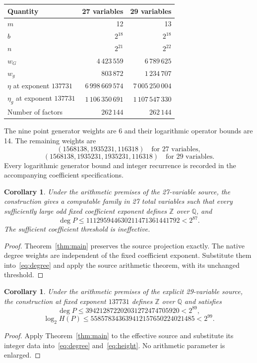 \documentclass[11pt,a4paper]{article}
\newtheorem{corollary}[theorem]{Corollary}
\newcommand{\Q}{\mathbb Q}\newcommand{\Z}{\mathbb Z}
\begin{document}
\begin{center}
\begin{tabular}{lrr}
\toprule
Quantity & 27 variables & 29 variables\\
\midrule
$m$ & 12 & 13\\
$b$ & $2^{18}$ & $2^{18}$\\
$n$ & $2^{21}$ & $2^{22}$\\
$w_G$ & $4\,423\,559$ & $6\,789\,625$\\
$w_g$ & $803\,872$ & $1\,234\,707$\\
$\eta$ at exponent $137731$ & $6\,998\,669\,574$ & $7\,005\,250\,004$\\
$\eta_g$ at exponent $137731$ & $1\,106\,350\,691$ & $1\,107\,547\,330$\\
Number of factors & $262\,144$ & $262\,144$\\
\bottomrule
\end{tabular}
\end{center}
The nine point generator weights are 6 and their logarithmic
operator bounds are 14. The remaining weights are
\[
 (1568138,1935231,116318)\quad\text{for 27 variables},
\]
\[
 (1568138,1935231,1935231,116318)\quad\text{for 29 variables}.
\]
Every logarithmic generator bound and integer recurrence is
recorded in the accompanying coefficient specifications.

\begin{corollary}\label{cor:27}
Under the arithmetic premises of the 27-variable source,
the construction gives a computable family in 27 total variables
such that every sufficiently large odd fixed coefficient exponent
defines $\Z$ over $\Q$, and
\[
 \deg P\le111295944630211471361441792<2^{87}.
\]
The sufficient coefficient threshold is ineffective.
\end{corollary}
\begin{proof}
Theorem~\ref{thm:main} preserves the source projection exactly.
The native degree weights are independent of the fixed coefficient
exponent. Substitute them into~\eqref{eq:degree} and apply the
source arithmetic theorem, with its unchanged threshold.
\end{proof}

\begin{corollary}\label{cor:29}
Under the arithmetic premises of the explicit 29-variable source,
the construction at fixed exponent $137731$ defines $\Z$ over
$\Q$ and satisfies
\[
 \deg P\le394212872202031272474705920<2^{89},
\]
\[
 \log_2 H(P)\le558578343639412157650224021485<2^{99}.
\]
\end{corollary}
\begin{proof}
Apply Theorem~\ref{thm:main} to the effective source and substitute
its integer data into~\eqref{eq:degree} and~\eqref{eq:height}.
No arithmetic parameter is enlarged.
\end{proof}
\end{document}
